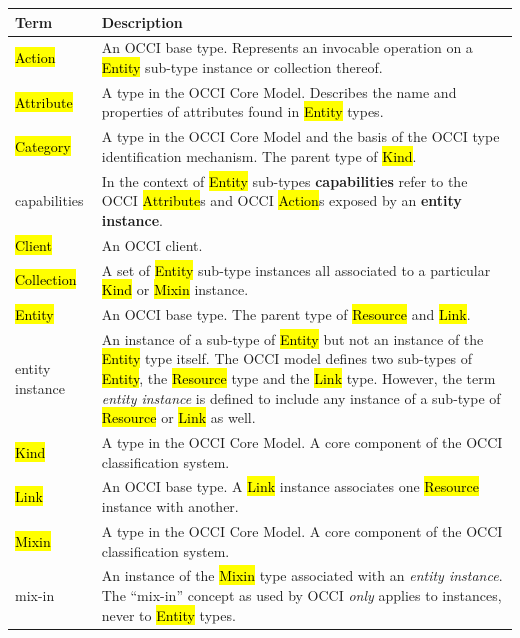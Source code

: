 \documentclass[10pt,a4paper]{article}
\begin{document}
\begin{tabular}{l|p{12cm}}
Term & Description \\
\hline
\hl{Action} & An OCCI base type. Represents an invocable operation on a \hl{Entity} sub-type instance or collection thereof. \\

\hl{Attribute} & A type in the OCCI Core Model. Describes the name and properties of attributes found in \hl{Entity} types. \\

\hl{Category} & A type in the OCCI Core Model and the basis of the OCCI type identification mechanism. The parent type of \hl{Kind}. \\

capabilities & In the context of \hl{Entity} sub-types {\bf  capabilities} refer
  to the OCCI \hl{Attribute}s and OCCI \hl{Action}s exposed by an {\bf entity
  instance}. \\

\hl{Client} & An OCCI client.\\

\hl{Collection} & A set of \hl{Entity} sub-type instances all associated to a particular \hl{Kind} or \hl{Mixin} instance. \\

\hl{Entity} & An OCCI base type. The parent type of \hl{Resource} and \hl{Link}. \\

entity instance & An instance of a sub-type of \hl{Entity} but not an instance
  of the \hl{Entity} type itself.  The OCCI model defines two sub-types of
  \hl{Entity}, the \hl{Resource} type and the \hl{Link} type.  However, the
  term {\em entity instance} is defined to include any instance of a
  sub-type of \hl{Resource} or \hl{Link} as well. \\

\hl{Kind} & A type in the OCCI Core Model. A core component of the OCCI classification system. \\

\hl{Link} & An OCCI base type. A \hl{Link} instance associates one \hl{Resource} instance with another. \\

\hl{Mixin} & A type in the OCCI Core Model. A core component of the OCCI classification system. \\

mix-in & An instance of the \hl{Mixin} type associated with an {\em entity
 instance}. The ``mix-in'' concept as used by OCCI {\em only} applies to
 instances, never to \hl{Entity} types. \\


\end{tabular}
\end{document}
